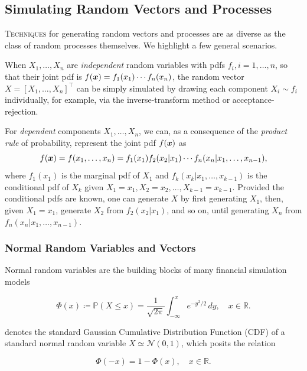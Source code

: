 \subsection{Simulating Random Vectors and Processes}
\lettrine[lines=2, lhang=0.1]{T}{echniques} for generating random vectors and processes are as diverse as the class of random processes themselves. We highlight a few general scenarios.

When \(X_1, \dots, X_n\) are \textit{independent} random variables with pdfs \(f_i, i = 1, \dots, n\), so that their joint pdf is \(f(\boldsymbol{x}) = f_1(x_1) \cdots f_n(x_n)\), the random vector \(X = [X_1, \dots, X_n]^\top\) can be simply simulated by drawing each component \(X_i \sim f_i\) individually, for example, via the inverse-transform method or acceptance-rejection.

For \textit{dependent} components \(X_1, \dots, X_n\), we can, as a consequence of the \textit{product rule} of probability, represent the joint pdf \(f(\boldsymbol{x})\) as
\begin{equation} \label{eq:JointPdfProductRule}
	f(\boldsymbol{x}) = f(x_1, \dots, x_n) = f_1(x_1) f_2(x_2 | x_1) \cdots f_n(x_n | x_1, \dots, x_{n-1}),
\end{equation}
where \(f_1(x_1)\) is the marginal pdf of \(X_1\) and \(f_k(x_k | x_1, \dots, x_{k-1})\) is the conditional pdf of \(X_k\) given \(X_1 = x_1, X_2 = x_2, \dots, X_{k-1} = x_{k-1}\). Provided the conditional pdfs are known, one can generate \(X\) by first generating \(X_1\), then, given \(X_1 = x_1\), generate \(X_2\) from \(f_2(x_2 | x_1)\), and so on, until generating \(X_n\) from \(f_n(x_n | x_1, \dots, x_{n-1})\).

\subsubsection{Normal Random Variables and Vectors}
Normal random variables are the building blocks of many financial simulation models

\[
\Phi(x) \coloneqq \mathbb{P}(X \le x) = \frac{1}{\sqrt{2\pi}} \int_{-\infty}^{x} e^{-y^2 / 2} \, dy, \quad x \in \mathbb{R}.
\]

denotes the standard Gaussian Cumulative Distribution Function (CDF) of a standard normal random variable \(X \simeq \mathcal{N}(0,1)\), which posits the relation

\begin{equation}
	\Phi(-x) = 1 - \Phi(x), \quad x \in \mathbb{R}.
\end{equation}

